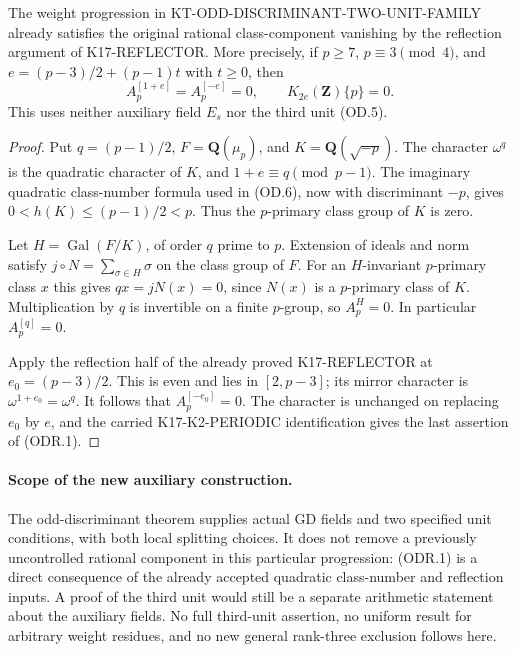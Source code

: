 \begin{proposition}
The weight progression in KT-ODD-DISCRIMINANT-TWO-UNIT-FAMILY
already satisfies the original rational class-component vanishing
by the reflection argument of K17-REFLECTOR.  More precisely, if
$p\geq7$, $p\equiv3\pmod4$, and
$e=(p-3)/2+(p-1)t$ with $t\geq0$, then
\[
 A_p^{[1+e]}=A_p^{[-e]}=0,
 \qquad K_{2e}(\mathbf Z)\{p\}=0.                     \tag{ODR.1}
\]
This uses neither auxiliary field $E_s$ nor the third unit (OD.5).
\end{proposition}
\begin{proof}
Put $q=(p-1)/2$, $F=\mathbf Q(\mu_p)$, and
$K=\mathbf Q(\sqrt{-p})$.  The character $\omega^q$ is the
quadratic character of $K$, and $1+e\equiv q\pmod{p-1}$.
The imaginary quadratic class-number formula used in (OD.6), now
with discriminant $-p$, gives $0<h(K)\leq(p-1)/2<p$.
Thus the $p$-primary class group of $K$ is zero.

Let $H=\operatorname{Gal}(F/K)$, of order $q$ prime to $p$.
Extension of ideals and norm satisfy
$j\circ N=\sum_{\sigma\in H}\sigma$ on the class group of $F$.
For an $H$-invariant $p$-primary class $x$ this gives
$q x=jN(x)=0$, since $N(x)$ is a $p$-primary class of $K$.
Multiplication by $q$ is invertible on a finite $p$-group, so
$A_p^H=0$.  In particular $A_p^{[q]}=0$.

Apply the reflection half of the already proved K17-REFLECTOR
at $e_0=(p-3)/2$.  This is even and lies in $[2,p-3]$;
its mirror character is $\omega^{1+e_0}=\omega^q$.
It follows that $A_p^{[-e_0]}=0$.  The character is unchanged
on replacing $e_0$ by $e$, and the carried K17-K2-PERIODIC
identification gives the last assertion of (ODR.1).
\end{proof}

\paragraph{Scope of the new auxiliary construction.}
The odd-discriminant theorem supplies actual GD fields and two
specified unit conditions, with both local splitting choices.
It does not remove a previously uncontrolled rational component
in this particular progression: (ODR.1) is a direct consequence
of the already accepted quadratic class-number and reflection
inputs.  A proof of the third unit would still be a separate
arithmetic statement about the auxiliary fields.  No full
third-unit assertion, no uniform result for arbitrary weight
residues, and no new general rank-three exclusion follows here.
